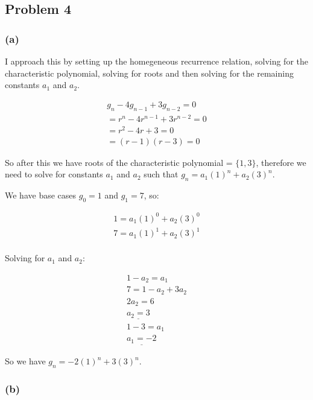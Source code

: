 \documentclass[10pt]{article}
\begin{document}
\newpage
\subsection*{Problem 4}

\subsubsection*{(a)}

I approach this by setting up the homegeneous recurrence relation, solving for the characteristic
polynomial, solving for roots and then solving for the remaining constants $a_{1}$ and $a_{2}$.

\begin{align*}
  g_{n} - 4g_{n - 1} + 3g_{n - 2} = 0 \\
  = r^{n} - 4r^{n - 1} + 3r^{n - 2} = 0 \\
  = r^2 - 4r + 3 = 0 \\
  = (r - 1)(r - 3) = 0
\end{align*}

\noindent
So after this we have roots of the characteristic polynomial = $\{1, 3\}$, therefore we need to solve
for constants $a_{1}$ and $a_{2}$ such that $g_{n} = a_{1}(1)^n + a_{2}(3)^n$.
\spacing

\noindent
We have base cases $g_{0} = 1$ and $g_{1} = 7$, so:

\begin{align*}
  1 = a_{1}(1)^0 + a_{2}(3)^0 \\
  7 = a_{1}(1)^1 + a_{2}(3)^1 \\
\end{align*}

\noindent
Solving for $a_{1}$ and $a_{2}$:

\begin{align*}
  1 - a_{2} = a_{1} \\
  7 = 1 - a_{2} + 3a_{2} \\
  2a_{2} = 6 \\
  \underline{a_{2} = 3} \\
  1 - 3 = a_{1} \\
  \underline{a_{1} = -2}
\end{align*}

\noindent
So we have $g_{n} = -2(1)^n + 3(3)^n$.

\subsubsection*{(b)}
\end{document}
